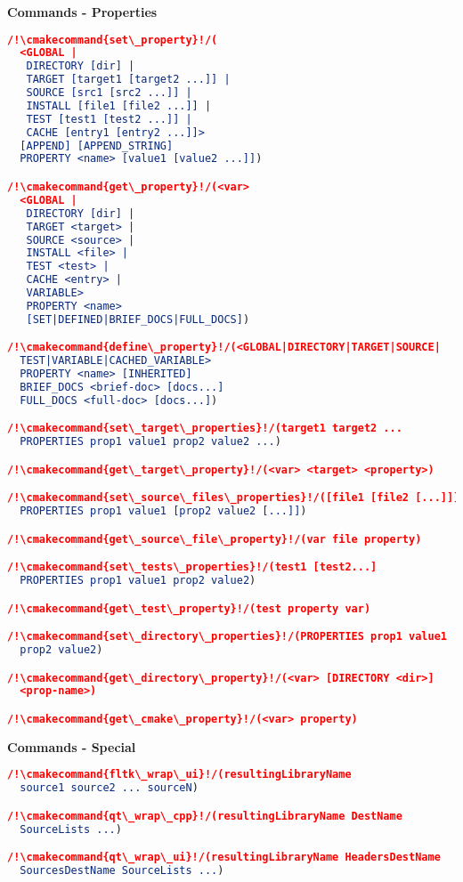 \documentclass{article}
\newcommand{\cmakecommand}[1]{{\href{https://cmake.org/cmake/help/v3.13/command/#1.html}{#1}}}
\begin{document}
\begin{minipage}[t]{0.18\linewidth}
\textbf{Commands - Properties}
\begin{lstlisting}[language=CMake]
/!\cmakecommand{set\_property}!/(
  <GLOBAL |
   DIRECTORY [dir] |
   TARGET [target1 [target2 ...]] |
   SOURCE [src1 [src2 ...]] |
   INSTALL [file1 [file2 ...]] |
   TEST [test1 [test2 ...]] |
   CACHE [entry1 [entry2 ...]]>
  [APPEND] [APPEND_STRING]
  PROPERTY <name> [value1 [value2 ...]])

/!\cmakecommand{get\_property}!/(<var>
  <GLOBAL |
   DIRECTORY [dir] |
   TARGET <target> |
   SOURCE <source> |
   INSTALL <file> |
   TEST <test> |
   CACHE <entry> |
   VARIABLE>
   PROPERTY <name>
   [SET|DEFINED|BRIEF_DOCS|FULL_DOCS])

/!\cmakecommand{define\_property}!/(<GLOBAL|DIRECTORY|TARGET|SOURCE|
  TEST|VARIABLE|CACHED_VARIABLE>
  PROPERTY <name> [INHERITED]
  BRIEF_DOCS <brief-doc> [docs...]
  FULL_DOCS <full-doc> [docs...])

/!\cmakecommand{set\_target\_properties}!/(target1 target2 ...
  PROPERTIES prop1 value1 prop2 value2 ...)

/!\cmakecommand{get\_target\_property}!/(<var> <target> <property>)

/!\cmakecommand{set\_source\_files\_properties}!/([file1 [file2 [...]]]
  PROPERTIES prop1 value1 [prop2 value2 [...]])

/!\cmakecommand{get\_source\_file\_property}!/(var file property)

/!\cmakecommand{set\_tests\_properties}!/(test1 [test2...]
  PROPERTIES prop1 value1 prop2 value2)

/!\cmakecommand{get\_test\_property}!/(test property var)

/!\cmakecommand{set\_directory\_properties}!/(PROPERTIES prop1 value1
  prop2 value2)

/!\cmakecommand{get\_directory\_property}!/(<var> [DIRECTORY <dir>]
  <prop-name>)

/!\cmakecommand{get\_cmake\_property}!/(<var> property)
\end{lstlisting}

\textbf{Commands - Special}
\begin{lstlisting}[language=CMake]
/!\cmakecommand{fltk\_wrap\_ui}!/(resultingLibraryName
  source1 source2 ... sourceN)

/!\cmakecommand{qt\_wrap\_cpp}!/(resultingLibraryName DestName
  SourceLists ...)

/!\cmakecommand{qt\_wrap\_ui}!/(resultingLibraryName HeadersDestName
  SourcesDestName SourceLists ...)
\end{lstlisting}
\end{minipage}
\end{document}
